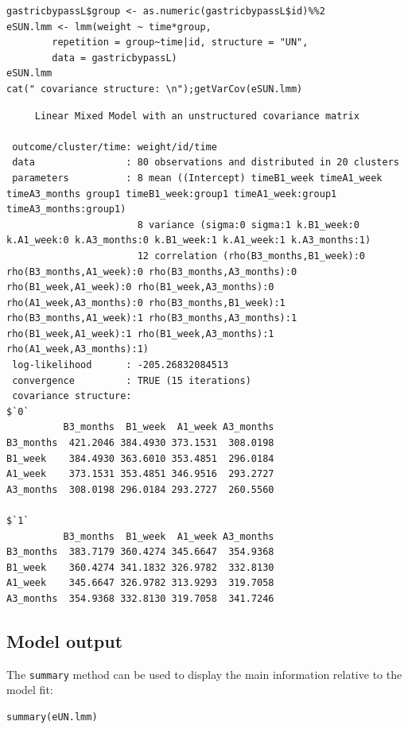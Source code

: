 \documentclass[12pt]{article}
\begin{document}
\lstset{language=r,label= ,caption= ,captionpos=b,numbers=none}
\begin{lstlisting}
gastricbypassL$group <- as.numeric(gastricbypassL$id)%%2
eSUN.lmm <- lmm(weight ~ time*group,
		repetition = group~time|id, structure = "UN",
		data = gastricbypassL)
eSUN.lmm
cat(" covariance structure: \n");getVarCov(eSUN.lmm)
\end{lstlisting}

\begin{verbatim}
     Linear Mixed Model with an unstructured covariance matrix 

 outcome/cluster/time: weight/id/time 
 data                : 80 observations and distributed in 20 clusters 
 parameters          : 8 mean ((Intercept) timeB1_week timeA1_week timeA3_months group1 timeB1_week:group1 timeA1_week:group1 timeA3_months:group1) 
                       8 variance (sigma:0 sigma:1 k.B1_week:0 k.A1_week:0 k.A3_months:0 k.B1_week:1 k.A1_week:1 k.A3_months:1) 
                       12 correlation (rho(B3_months,B1_week):0 rho(B3_months,A1_week):0 rho(B3_months,A3_months):0 rho(B1_week,A1_week):0 rho(B1_week,A3_months):0 rho(A1_week,A3_months):0 rho(B3_months,B1_week):1 rho(B3_months,A1_week):1 rho(B3_months,A3_months):1 rho(B1_week,A1_week):1 rho(B1_week,A3_months):1 rho(A1_week,A3_months):1) 
 log-likelihood      : -205.26832084513 
 convergence         : TRUE (15 iterations)
 covariance structure: 
$`0`
          B3_months  B1_week  A1_week A3_months
B3_months  421.2046 384.4930 373.1531  308.0198
B1_week    384.4930 363.6010 353.4851  296.0184
A1_week    373.1531 353.4851 346.9516  293.2727
A3_months  308.0198 296.0184 293.2727  260.5560

$`1`
          B3_months  B1_week  A1_week A3_months
B3_months  383.7179 360.4274 345.6647  354.9368
B1_week    360.4274 341.1832 326.9782  332.8130
A1_week    345.6647 326.9782 313.9293  319.7058
A3_months  354.9368 332.8130 319.7058  341.7246
\end{verbatim}

\clearpage
\subsection{Model output}
\label{sec:org8fc5e4a}

The \texttt{summary} method can be used to display the main information
relative to the model fit:
\lstset{language=r,label= ,caption= ,captionpos=b,numbers=none}
\begin{lstlisting}
summary(eUN.lmm)
\end{lstlisting}
\end{document}
